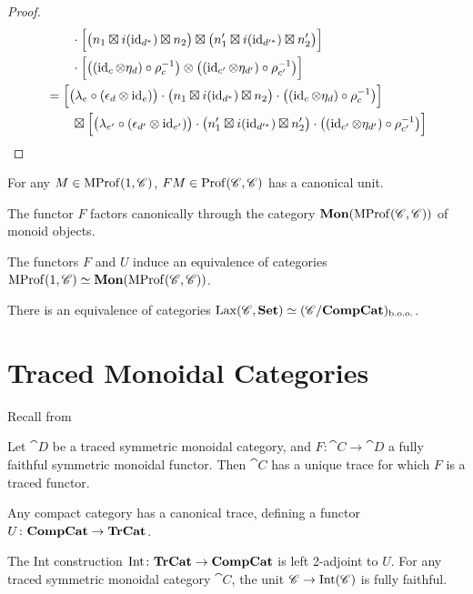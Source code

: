 \begin{proof}
\begin{align*}
		&\qquad \cdot\Bigl[\bigl(n_1\boxtimes i(\operatorname{id}_{d^*})\boxtimes n_2\bigr)\boxtimes\bigl(n'_1\boxtimes i(\operatorname{id}_{d'^*})\boxtimes n'_2\bigr)\Bigr] \\
		&\qquad \cdot\Bigl[\bigl((\operatorname{id}_c\otimes\eta_d)\circ\rho_c^{-1}\bigr)\otimes\bigl((\operatorname{id}_{c'}\otimes\eta_{d'})\circ\rho_{c'}^{-1}\bigr)\Bigr] \\
		&= \Bigl[\bigl(\lambda_e\circ(\epsilon_d\otimes\operatorname{id}_e)\bigr)\cdot\bigl(n_1\boxtimes i(\operatorname{id}_{d^*})\boxtimes n_2\bigr)\cdot\bigl((\operatorname{id}_c\otimes\eta_d)\circ\rho_c^{-1}\bigr)\Bigr] \\
		&\qquad \boxtimes\Bigl[\bigl(\lambda_{e'}\circ(\epsilon_{d'}\otimes\operatorname{id}_{e'})\bigr)\cdot\bigl(n'_1\boxtimes i(\operatorname{id}_{d'^*})\boxtimes n'_2\bigr)\cdot\bigl((\operatorname{id}_{c'}\otimes\eta_{d'})\circ\rho_{c'}^{-1}\bigr)\Bigr]
	\end{align*}
\end{proof}

\begin{proposition}
	For any $M\in\operatorname{MProf}(1,\mathscr{C})$, $FM\in\operatorname{Prof}(\mathscr{C},\mathscr{C})$ has a canonical unit.
\end{proposition}

\begin{corollary}
	The functor $F$ factors canonically through the category $\mathbf{Mon}(\operatorname{MProf}(\mathscr{C},\mathscr{C}))$ of monoid objects.
\end{corollary}

\begin{proposition}
	The functors $F$ and $U$ induce an equivalence of categories $\operatorname{MProf}(1,\mathscr{C})\simeq\mathbf{Mon}(\operatorname{MProf}(\mathscr{C},\mathscr{C}))$.
\end{proposition}

\begin{corollary}
	There is an equivalence of categories $\operatorname{Lax}(\mathscr{C},\mathbf{Set})\simeq(\mathscr{C}/\mathbf{CompCat})_{\text{b.o.o.}}$.
\end{corollary}

\chapter{Traced Monoidal Categories}

Recall from~\cite{JoyalStreet}
\begin{compactitem}
	\item Let $\cat{D}$ be a traced symmetric monoidal category, and $F\colon\cat{C}\to\cat{D}$ a fully faithful symmetric monoidal functor. Then $\cat{C}$ has a unique trace for which $F$ is a traced functor.
	\item Any compact category has a canonical trace, defining a functor $U\colon\mathbf{CompCat}\to\mathbf{TrCat}$.
	\item The Int construction $\operatorname{Int}\colon\mathbf{TrCat}\to\mathbf{CompCat}$ is left 2-adjoint to $U$. For any traced symmetric monoidal category $\cat{C}$, the unit $\mathscr{C}\to\operatorname{Int}(\mathscr{C})$ is fully faithful.
\end{compactitem}

